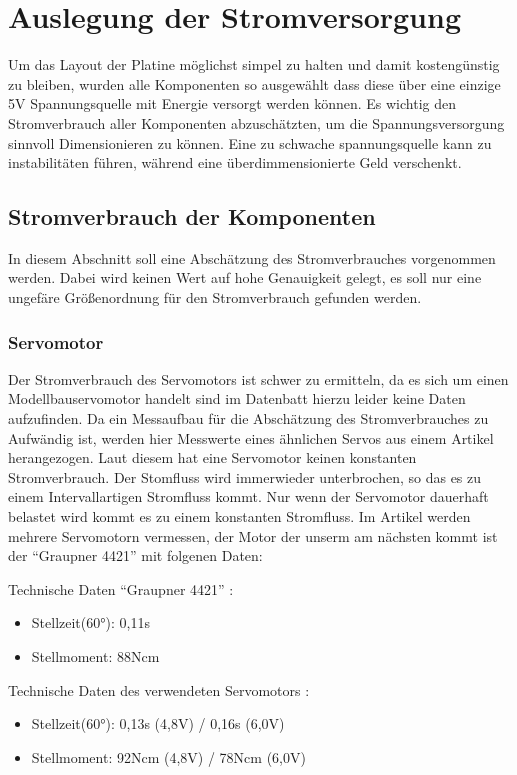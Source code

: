 \chapter{Auslegung der Stromversorgung}

Um das Layout der Platine möglichst simpel zu halten und damit kostengünstig zu bleiben, wurden alle Komponenten so ausgewählt dass diese über eine einzige 5V Spannungsquelle mit Energie versorgt werden können.
Es wichtig den Stromverbrauch aller Komponenten abzuschätzten, um die Spannungsversorgung sinnvoll Dimensionieren zu können. Eine zu schwache spannungsquelle kann zu instabilitäten führen,
während eine überdimmensionierte Geld verschenkt.

\section{Stromverbrauch der Komponenten}
In diesem Abschnitt soll eine Abschätzung des Stromverbrauches vorgenommen werden. Dabei wird keinen Wert auf hohe Genauigkeit gelegt, es soll nur eine ungefäre Größenordnung für den Stromverbrauch gefunden werden.

\subsection{Servomotor}
Der Stromverbrauch des Servomotors ist schwer zu ermitteln, da es sich um einen Modellbauservomotor handelt 
sind im Datenbatt hierzu leider keine Daten aufzufinden. Da ein Messaufbau für die Abschätzung des Stromverbrauches
zu Aufwändig ist, werden hier Messwerte eines ähnlichen Servos aus einem Artikel \cite{website-servo} herangezogen.
Laut diesem hat eine Servomotor keinen konstanten Stromverbrauch. Der Stomfluss wird immerwieder unterbrochen, so das es zu einem Intervallartigen Stromfluss kommt.
Nur wenn der Servomotor dauerhaft belastet wird kommt es zu einem konstanten Stromfluss.
Im Artikel werden mehrere Servomotorn vermessen, der Motor der unserm am nächsten kommt ist der ``Graupner 4421'' mit folgenen Daten:

Technische Daten ``Graupner 4421'' \cite{website-servo-vergleich-dat}:
\begin{itemize}
 \item Stellzeit(60°): 0,11s
 \item Stellmoment: 88Ncm 
\end{itemize}


Technische Daten des verwendeten Servomotors \cite{website-servo-dat}:
\begin{itemize}
 \item Stellzeit(60°): 0,13s (4,8V) / 0,16s (6,0V)
 \item Stellmoment: 92Ncm (4,8V) / 78Ncm (6,0V)
\end{itemize}



